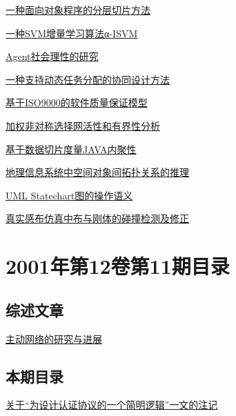 \documentclass[a4paper]{article}
\begin{document}
\href{http://www.jos.org.cn/ch/reader/download_pdf.aspx?file_no=20011210&year_id=2001&quarter_id=12&falg=1}{一种面向对象程序的分层切片方法}

\href{http://www.jos.org.cn/ch/reader/download_pdf.aspx?file_no=20011211&year_id=2001&quarter_id=12&falg=1}{一种SVM增量学习算法α-ISVM}

\href{http://www.jos.org.cn/ch/reader/download_pdf.aspx?file_no=20011212&year_id=2001&quarter_id=12&falg=1}{Agent社会理性的研究}

\href{http://www.jos.org.cn/ch/reader/download_pdf.aspx?file_no=20011213&year_id=2001&quarter_id=12&falg=1}{一种支持动态任务分配的协同设计方法}

\href{http://www.jos.org.cn/ch/reader/download_pdf.aspx?file_no=20011214&year_id=2001&quarter_id=12&falg=1}{基于ISO9000的软件质量保证模型}

\href{http://www.jos.org.cn/ch/reader/download_pdf.aspx?file_no=20011215&year_id=2001&quarter_id=12&falg=1}{加权非对称选择网活性和有界性分析}

\href{http://www.jos.org.cn/ch/reader/download_pdf.aspx?file_no=20011216&year_id=2001&quarter_id=12&falg=1}{基于数据切片度量JAVA内聚性}

\href{http://www.jos.org.cn/ch/reader/download_pdf.aspx?file_no=20011217&year_id=2001&quarter_id=12&falg=1}{地理信息系统中空间对象间拓扑关系的推理}

\href{http://www.jos.org.cn/ch/reader/download_pdf.aspx?file_no=20011218&year_id=2001&quarter_id=12&falg=1}{UML Statechart图的操作语义}

\href{http://www.jos.org.cn/ch/reader/download_pdf.aspx?file_no=20011219&year_id=2001&quarter_id=12&falg=1}{真实感布仿真中布与刚体的碰撞检测及修正}


\section{\textbf{2001年第12卷第11期目录}}
\subsection{综述文章}
\href{http://www.jos.org.cn/ch/reader/download_pdf.aspx?file_no=20011106&year_id=2001&quarter_id=11&falg=1}{主动网络的研究与进展}

\subsection{本期目录}
\href{http://www.jos.org.cn/ch/reader/download_pdf.aspx?file_no=20011101&year_id=2001&quarter_id=11&falg=1}{关于“为设计认证协议的一个简明逻辑”一文的注记}
\end{document}
